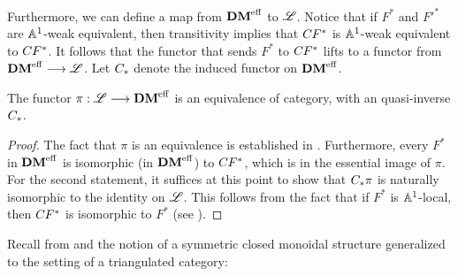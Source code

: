 Furthermore, we can define a map from $\DMeff$ to $\ALocal$. 
Notice that if $F^*$ and ${F'}^*$ are $\A^1$-weak equivalent, then
transitivity implies that $\suslC[] F^*$ is $\A^1$-weak equivalent 
to $\suslC[] F^*$. It follows that the functor that sends $F^*$
to $\suslC[] F^*$ lifts to a functor from $\DMeff \to \ALocal$.
Let $\suslC$ denote the induced functor on $\DMeff$.

\begin{thm}
The functor $\pi: \ALocal \to \DMeff$ is an equivalence of 
category, with an quasi-inverse $\suslC$.
\end{thm}

\begin{proof}
The fact that $\pi$ is an equivalence is established in
\cite[Theorem 14.11]{MVW}. Furthermore, every $F^*$ in
$\DMeff$ is isomorphic (in $\DMeff$) to $\suslC[] F^*$, which
is in the essential image of $\pi$. For the second statement,
it suffices at this point to show that $\suslC \pi$ is naturally
isomorphic to the identity on $\ALocal$. This follows from the
fact that if $F^*$ is $\A^1$-local, then $\suslC[] F^*$ is 
isomorphic to $F^*$ (see \cite[Corollary 14.9]{MVW}).
\end{proof}

Recall from \cite[1.13]{MK} and \cite[8A.1]{MVW} the notion of a 
symmetric closed monoidal structure generalized to the setting of 
a triangulated category:

